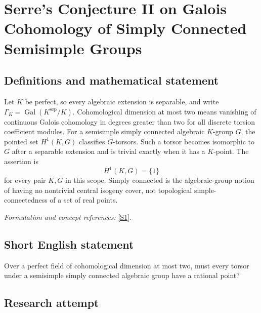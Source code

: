 \documentclass[11pt,a4paper]{article}
\newcommand{\sref}[2]{\hyperlink{source:#1:#2}{[S#2]}}
\newif\ifshowcatalogue
\newcommand{\cataloguescope}[1]{\ifshowcatalogue
 \paragraph{Exact scope in the supplied catalogue.}
 \begin{quote}\small #1\end{quote}\fi}
\numberwithin{equation}{section}
\begin{document}
\setcounter{section}{225}
\clearpage
\section{\texorpdfstring{Serre's Conjecture II on Galois Cohomology of Simply Connected Semisimple Groups}{Serre's Conjecture II on Galois Cohomology of Simply Connected Semisimple Groups}}\label{226}
\subsection{Definitions and mathematical statement}
Let $K$ be perfect, so every algebraic extension is separable, and write $\Gamma_K=\operatorname{Gal}(K^{\mathrm{sep}}/K)$. Cohomological dimension at most two means vanishing of continuous Galois cohomology in degrees greater than two for all discrete torsion coefficient modules. For a semisimple simply connected algebraic $K$-group $G$, the pointed set $H^1(K,G)$ classifies $G$-torsors. Such a torsor becomes isomorphic to $G$ after a separable extension and is trivial exactly when it has a $K$-point. The assertion is
\[
 H^1(K,G)=\{1\}
\]
for every pair $K,G$ in this scope. Simply connected is the algebraic-group notion of having no nontrivial central isogeny cover, not topological simple-connectedness of a set of real points.
\par\smallskip\textit{Formulation and concept references:} \sref{226}{1}.
\cataloguescope{Let K be a perfect field of cohomological dimension at most 2. Prove that every principal homogeneous space under a semisimple simply connected linear algebraic K-group has a rational point, i.e. H\textasciicircum{}1(K,G) = 1 for every such group G.}
\subsection{Short English statement}
Over a perfect field of cohomological dimension at most two, must every torsor under a semisimple simply connected algebraic group have a rational point?
\subsection{Research attempt}
\end{document}
